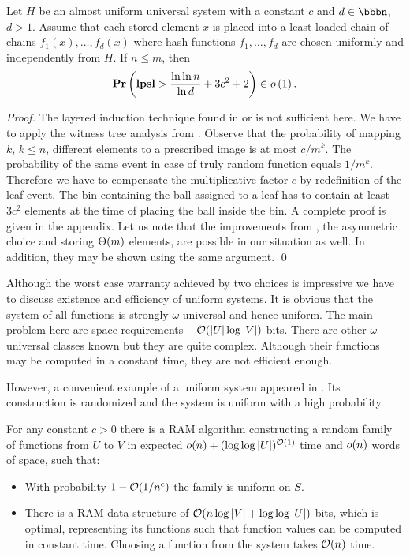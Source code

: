 \begin{theorem}
\label{theorem-universal-hashing-two-choices}
Let $H$ be an almost uniform universal system with a constant $c$ and $d \in \bbbn$, $d > 1$. Assume that each stored element $x$ is placed into a least loaded chain of chains $f_1(x), \dots, f_d(x)$ where hash functions $f_1, \dots, f_d$ are chosen uniformly and independently from $H$. If $n \leq m$, then $$\mathbf{Pr}\left(\mathbf{lpsl} > \frac{\ln \ln n}{\ln d} + 3c^2 + 2\right) \in o\left(1\right).$$
\end{theorem}
\begin{proof}
The layered induction technique found in \cite{Mitzenmacher:2005:PCR:1076315} or \cite{DBLP:conf/stoc/AzarBKU94} is not sufficient here. 
We have to apply the witness tree analysis from \cite{DBLP:journals/jacm/Vocking03}. 
Observe that the probability of mapping $k$, $k \leq n$, different elements to a prescribed image is at most ${c}/{m^k}$. 
The probability of the same event in case of truly random function equals ${1}/{m^k}$. 
Therefore we have to compensate the multiplicative factor $c$ by redefinition of the leaf event. 
The bin containing the ball assigned to a leaf has to contain at least $3c^2$ elements at the time of placing the ball inside the bin.
A complete proof is given in the appendix.
Let us note that the improvements from \cite{DBLP:journals/jacm/Vocking03}, the asymmetric choice and storing $\mathrm{\Theta}(m)$ elements, are possible in our situation as well. 
In addition, they may be shown using the same argument.
\qed
\end{proof}

Although the worst case warranty achieved by two choices is impressive we have to discuss existence and efficiency of uniform systems. It is obvious that the system of all functions is strongly $\omega$-universal and hence uniform. The main problem here are space requirements -- $\mathcal{O}(|U| \log |V|)$ bits. There are other $\omega$-universal classes known but they are quite complex. Although their functions may be computed in a constant time, they are not efficient enough. 

However, a convenient example of a uniform system appeared in \cite{DBLP:journals/siamcomp/PaghP08}. Its construction is randomized and the system is uniform with a high probability.
\begin{theorem}
\label{theorem-uniform-system}
For any constant $c > 0$ there is a RAM algorithm constructing a random family of functions from $U$ to $V$ in expected $o(n) + (\log \log|U|)^{\mathcal{O}(1)}$ time and $o(n)$ words of space, such that:
\begin{itemize}
\item With probability $1 - \mathcal{O}(1 / n^c)$ the family is uniform on $S$.
\item There is a RAM data structure of $\mathcal{O}(n \log|V| + \log \log|U|)$ bits, which is optimal, representing its functions such that function values can be computed in constant time. Choosing a function from the system takes $\mathcal{O}(n)$ time.
\end{itemize}
\end{theorem}

